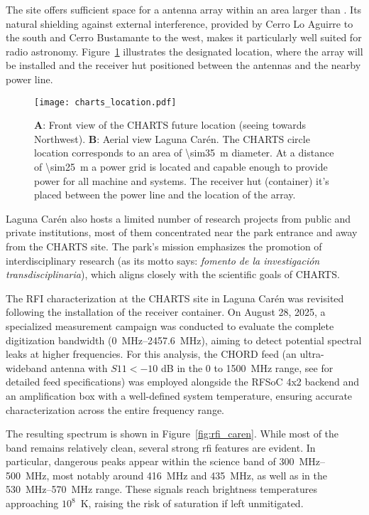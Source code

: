The site offers sufficient space for a  antenna array within an area larger than . Its natural shielding against external interference, provided by Cerro Lo Aguirre to the south and Cerro Bustamante to the west, makes it particularly well suited for radio astronomy. Figure~\ref{fig:charts_location} illustrates the designated location, where the array will be installed and the receiver hut positioned between the antennas and the nearby power line.  
\begin{figure}[h!]
  \centering
  \texttt{[image: charts\_location.pdf]}
  \caption[Site layout and infrastructure]{\textbf{A}: Front view of the CHARTS future location (seeing towards Northwest). \textbf{B}: Aerial view Laguna Carén. The CHARTS circle location corresponds to an area of \qty{\sim35}{\m} diameter. At a distance of \qty{\sim25}{\m} a power grid is located and capable enough to provide power for all machine and systems. The receiver hut (container) it's placed  between the power line and the location of the array.}
  \label{fig:charts_location}
\end{figure}


Laguna Carén also hosts a limited number of research projects from public and private institutions, most of them concentrated near the park entrance and away from the CHARTS site. The park’s mission emphasizes the promotion of interdisciplinary research (as its motto says: \textit{fomento de la investigación transdisciplinaria}), which aligns closely with the scientific goals of CHARTS.


The RFI characterization at the CHARTS site in Laguna Carén was revisited following the installation of the receiver container. On August 28, 2025, a specialized measurement campaign was conducted to evaluate the complete digitization bandwidth (\SI{0}{\mega\hertz}–\SI{2457.6}{\mega\hertz}), aiming to detect potential spectral leaks at higher frequencies. For this analysis, the CHORD feed (an ultra-wideband antenna with $S11 < -10$ dB in the 0 to \SI{1500}{\mega\hertz} range, see \citealt{MacKay_2023} for detailed feed specifications) was employed alongside the RFSoC 4x2 backend and an amplification box with a well-defined system temperature, ensuring accurate characterization across the entire frequency range.

The resulting spectrum is shown in Figure~\ref{fig:rfi_caren}. While most of the band remains relatively clean, several strong \gls{rfi} features are evident. In particular, dangerous peaks appear within the science band of \SIrange{300}{500}{\mega\hertz}, most notably around \SI{416}{\mega\hertz} and \SI{435}{\mega\hertz}, as well as in the \SIrange{530}{570}{\mega\hertz} range. These signals reach brightness temperatures approaching $10^8$~K, raising the risk of saturation if left unmitigated.  

